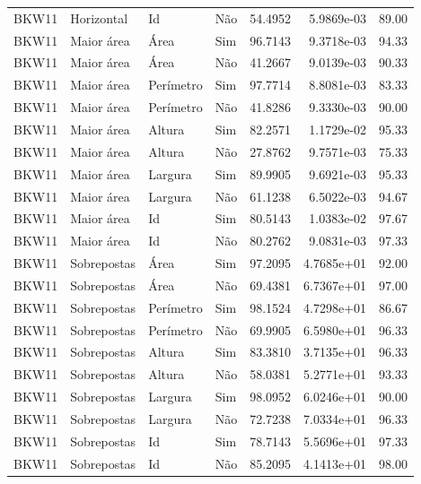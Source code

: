 \begin{tabular}{llllrrr}
BKW11     & Horizontal  & Id        & Não         & 54.4952      & 5.9869e-03 & 89.00    \\
BKW11     & Maior área  & Área      & Sim         & 96.7143      & 9.3718e-03 & 94.33    \\
BKW11     & Maior área  & Área      & Não         & 41.2667      & 9.0139e-03 & 90.33    \\
BKW11     & Maior área  & Perímetro & Sim         & 97.7714      & 8.8081e-03 & 83.33    \\
BKW11     & Maior área  & Perímetro & Não         & 41.8286      & 9.3330e-03 & 90.00    \\
BKW11     & Maior área  & Altura    & Sim         & 82.2571      & 1.1729e-02 & 95.33    \\
BKW11     & Maior área  & Altura    & Não         & 27.8762      & 9.7571e-03 & 75.33    \\
BKW11     & Maior área  & Largura   & Sim         & 89.9905      & 9.6921e-03 & 95.33    \\
BKW11     & Maior área  & Largura   & Não         & 61.1238      & 6.5022e-03 & 94.67    \\
BKW11     & Maior área  & Id        & Sim         & 80.5143      & 1.0383e-02 & 97.67    \\
BKW11     & Maior área  & Id        & Não         & 80.2762      & 9.0831e-03 & 97.33    \\
BKW11     & Sobrepostas & Área      & Sim         & 97.2095      & 4.7685e+01 & 92.00    \\
BKW11     & Sobrepostas & Área      & Não         & 69.4381      & 6.7367e+01 & 97.00    \\
BKW11     & Sobrepostas & Perímetro & Sim         & 98.1524      & 4.7298e+01 & 86.67    \\
BKW11     & Sobrepostas & Perímetro & Não         & 69.9905      & 6.5980e+01 & 96.33    \\
BKW11     & Sobrepostas & Altura    & Sim         & 83.3810      & 3.7135e+01 & 96.33    \\
BKW11     & Sobrepostas & Altura    & Não         & 58.0381      & 5.2771e+01 & 93.33    \\
BKW11     & Sobrepostas & Largura   & Sim         & 98.0952      & 6.0246e+01 & 90.00    \\
BKW11     & Sobrepostas & Largura   & Não         & 72.7238      & 7.0334e+01 & 96.33    \\
BKW11     & Sobrepostas & Id        & Sim         & 78.7143      & 5.5696e+01 & 97.33    \\
BKW11     & Sobrepostas & Id        & Não         & 85.2095      & 4.1413e+01 & 98.00    \\
\hline
\end{tabular}